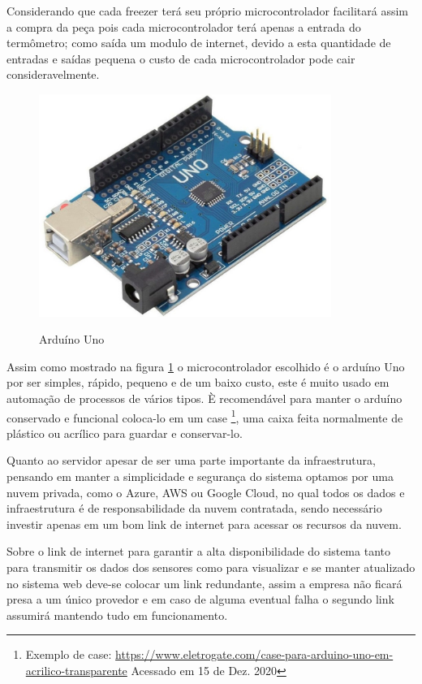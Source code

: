     Considerando que cada freezer terá seu próprio microcontrolador
    facilitará assim a compra da peça pois cada microcontrolador 
    terá apenas a entrada do termômetro;
    como saída um modulo de internet, 
    devido a esta quantidade de entradas e saídas pequena o custo
    de cada microcontrolador pode cair consideravelmente.

    \begin{figure}[ht]
        \caption{Arduíno Uno}
        \centering
        \includegraphics[width=0.85\textwidth]{img/arduino_uno.jpg}
        \label{fig:arduinoUno}
    \end{figure}


    Assim como mostrado na figura \ref{fig:arduinoUno}
    o microcontrolador escolhido é o arduíno Uno
    por ser simples, rápido, pequeno e de um baixo custo,
    este é muito usado em automação de processos
    de vários tipos. È recomendável para manter o 
    arduíno conservado e funcional coloca-lo em um case
    \footnote{
        Exemplo de case: \url{https://www.eletrogate.com/case-para-arduino-uno-em-acrilico-transparente}
        Acessado em 15 de Dez. 2020
    },
    uma caixa feita normalmente de plástico ou acrílico 
    para guardar e conservar-lo.

    Quanto ao servidor apesar de ser uma parte importante 
    da infraestrutura, pensando em manter a simplicidade 
    e segurança do sistema optamos por uma nuvem privada,
    como o Azure, AWS ou Google Cloud, no qual todos os 
    dados e infraestrutura é de responsabilidade da 
    nuvem contratada, sendo necessário investir apenas 
    em um bom link de internet para acessar os recursos 
    da nuvem.

    Sobre o link de internet para garantir a 
    alta disponibilidade do sistema tanto 
    para transmitir os dados dos sensores 
    como para visualizar e se manter atualizado
    no sistema web deve-se colocar um link redundante,
    assim a empresa não ficará presa a um único provedor 
    e em caso de alguma eventual falha o segundo link 
    assumirá mantendo tudo em funcionamento.
